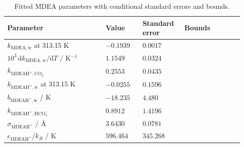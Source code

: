 \begin{table}[htbp]\small\setlength{\tabcolsep}{2pt}\caption{Fitted MDEA parameters with conditional standard errors and bounds.}\label{tab:p2-mdea-fitted-current}
\begin{tabular}{@{}>{\raggedright\arraybackslash}p{0.4\linewidth}>{\raggedright\arraybackslash}p{0.15\linewidth}>{\raggedright\arraybackslash}p{0.17\linewidth}>{\raggedright\arraybackslash}p{0.24\linewidth}@{}}
\toprule Parameter & Value & Standard error & Bounds \\ \midrule
$k_{\mathrm{MDEA,w}}$ at 313.15 K & $-0.1939$ & $0.0017$ & [$-0.5000$, $0.5000$] \\
$10^{3}\,\mathrm{d}k_{\mathrm{MDEA,w}}/\mathrm{d}T$ / K$^{-1}$ & $1.1549$ & $0.0324$ & [$-10.0000$, $10.0000$] \\
$k_{\mathrm{MDEAH^+,CO_2}}$ & $0.2553$ & $0.0435$ & [$-0.5000$, $0.5000$] \\
$k_{\mathrm{MDEAH^+,w}}$ at 313.15 K & $-0.0255$ & $0.1596$ & [$-0.5000$, $0.5000$] \\
$b_{\mathrm{MDEAH^+,w}}$ / K & $-18.235$ & $4.480$ & [$-1000.000$, $1000.000$] \\
$k_{\mathrm{MDEAH^+,HCO_3^-}}$ & $0.8912$ & $1.4196$ & [$-1.0000$, $1.0000$] \\
$\sigma_{\mathrm{MDEAH^+}}$ / \AA & $3.6430$ & $0.0781$ & [$3.0000$, $4.5000$] \\
$\epsilon_{\mathrm{MDEAH^+}}/k_B$ / K & $596.464$ & $345.268$ & [$50.000$, $950.000$] \\
\bottomrule\end{tabular}
\par{}\end{table}
